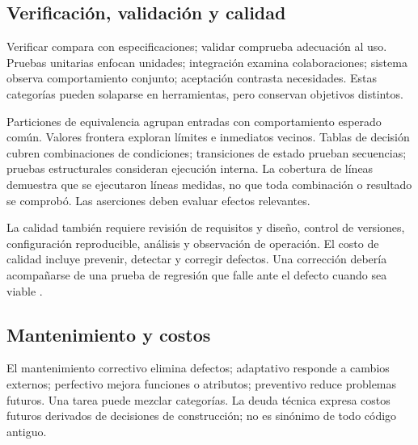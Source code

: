 \subsection{Verificación, validación y calidad}
Verificar compara con especificaciones; validar comprueba adecuación al uso. Pruebas unitarias enfocan unidades; integración examina colaboraciones; sistema observa comportamiento conjunto; aceptación contrasta necesidades. Estas categorías pueden solaparse en herramientas, pero conservan objetivos distintos.

Particiones de equivalencia agrupan entradas con comportamiento esperado común. Valores frontera exploran límites e inmediatos vecinos. Tablas de decisión cubren combinaciones de condiciones; transiciones de estado prueban secuencias; pruebas estructurales consideran ejecución interna. La cobertura de líneas demuestra que se ejecutaron líneas medidas, no que toda combinación o resultado se comprobó. Las aserciones deben evaluar efectos relevantes.

La calidad también requiere revisión de requisitos y diseño, control de versiones, configuración reproducible, análisis y observación de operación. El costo de calidad incluye prevenir, detectar y corregir defectos. Una corrección debería acompañarse de una prueba de regresión que falle ante el defecto cuando sea viable \cite[áreas Requirements, Design, Testing, Maintenance y Quality]{swebok}.

\subsection{Mantenimiento y costos}
El mantenimiento correctivo elimina defectos; adaptativo responde a cambios externos; perfectivo mejora funciones o atributos; preventivo reduce problemas futuros. Una tarea puede mezclar categorías. La deuda técnica expresa costos futuros derivados de decisiones de construcción; no es sinónimo de todo código antiguo.

